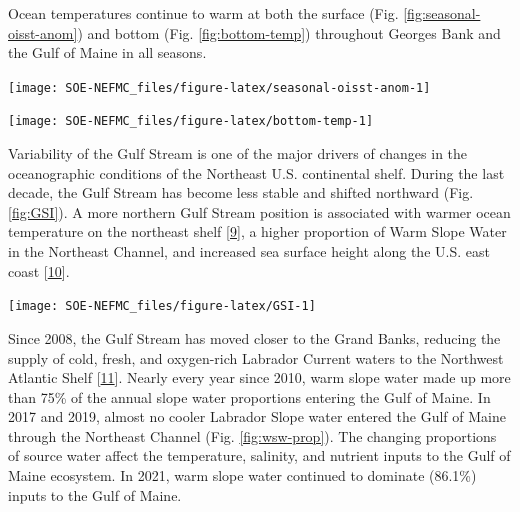 \documentclass[
  10pt,
]{article}
\let\origfigure\figure
\let\endorigfigure\endfigure
\renewenvironment{figure}[1][2] {
    \expandafter\origfigure\expandafter[H]
} {
    \endorigfigure
}
\begin{document}
Ocean temperatures continue to warm at both the surface (Fig. \ref{fig:seasonal-oisst-anom}) and bottom (Fig. \ref{fig:bottom-temp}) throughout Georges Bank and the Gulf of Maine in all seasons.

\begin{figure}

{\centering \texttt{[image: SOE-NEFMC\_files/figure-latex/seasonal-oisst-anom-1]} 

}

\caption{GB and GOM seasonal sea surface temperature (SST) time series . Seasons are defined as: Jan-Mar for winter, Apr-Jun for spring, Jul-Sep for summer, and Oct-Dec for fall.}\label{fig:seasonal-oisst-anom}
\end{figure}

\begin{figure}

{\centering \texttt{[image: SOE-NEFMC\_files/figure-latex/bottom-temp-1]} 

}

\caption{MAB seasonal bottom temperature (BT) anomaly time series. Seasons are defined as: Jan-Mar for winter, Apr-Jun for spring, Jul-Sep for summer, and Oct-Dec for fall.}\label{fig:bottom-temp}
\end{figure}

Variability of the Gulf Stream is one of the major drivers of changes in the oceanographic conditions of the Northeast U.S. continental shelf. During the last decade, the Gulf Stream has become less stable and shifted northward (Fig. \ref{fig:GSI}). A more northern Gulf Stream position is associated with warmer ocean temperature on the northeast shelf {[}\protect\hyperlink{ref-zhang_role_2007}{9}{]}, a higher proportion of Warm Slope Water in the Northeast Channel, and increased sea surface height along the U.S. east coast {[}\protect\hyperlink{ref-goddard_extreme_2015}{10}{]}.

\begin{figure}

{\centering \texttt{[image: SOE-NEFMC\_files/figure-latex/GSI-1]} 

}

\caption{Index representing changes in the location of the Gulf Stream north wall. Positive values represent a more northerly Gulf Stream position.}\label{fig:GSI}
\end{figure}

Since 2008, the Gulf Stream has moved closer to the Grand Banks, reducing the supply of cold, fresh, and oxygen-rich Labrador Current waters to the Northwest Atlantic Shelf {[}\protect\hyperlink{ref-goncalves_neto_changes_2021}{11}{]}. Nearly every year since 2010, warm slope water made up more than 75\% of the annual slope water proportions entering the Gulf of Maine. In 2017 and 2019, almost no cooler Labrador Slope water entered the Gulf of Maine through the Northeast Channel (Fig. \ref{fig:wsw-prop}). The changing proportions of source water affect the temperature, salinity, and nutrient inputs to the Gulf of Maine ecosystem. In 2021, warm slope water continued to dominate (86.1\%) inputs to the Gulf of Maine.
\end{document}
